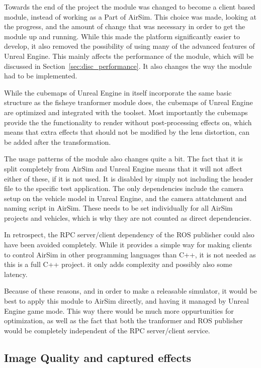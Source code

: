 Towards the end of the project the module was changed to become a client based module, instead of working as a Part of AirSim. This choice was made, looking at the progress, and the amount of change that was necessary in order to get the module up and running. While this made the platform significantly easier to develop, it also removed the possibility of using many of the advanced features of Unreal Engine. This mainly affects the performance of the module, which will be discussed in Section~\ref{sec:disc_performance}. It also changes the way the module had to be implemented.

While the cubemaps of Unreal Engine in itself incorporate the same basic structure as the fisheye tranformer module does, the cubemaps of Unreal Engine are optimized and integrated with the toolset. Most importantly the cubemaps provide the the functionality to render without post-processing effects on, which means that extra effects that should not be modified by the lens distortion, can be added after the transformation.

The usage patterns of the module also changes quite a bit. The fact that it is split completely from AirSim and Unreal Engine means that it will not affect either of these, if it is not used. It is disabled by simply not including the header file to the specific test application. The only dependencies include the camera setup on the vehicle model in Unreal Engine, and the camera attatchment and naming script in AirSim. These needs to be set individually for all AirSim projects and vehicles, which is why they are not counted as direct dependencies.

In retrospect, the RPC server/client dependency of the ROS publisher could also have been avoided completely. While it provides a simple way for making clients to control AirSim in other programming languages than C++, it is not needed as this is a full C++ project. it only adds complexity and possibly also some latency.

Because of these reasons, and in order to make a releasable simulator, it would be best to apply this module to AirSim directly, and having it managed by Unreal Engine game mode. This way there would be much more oppurtunities for optimization, as well as the fact that both the tranformer and ROS publisher would be completely independent of the RPC server/client service.

\subsection{Image Quality and captured effects}

